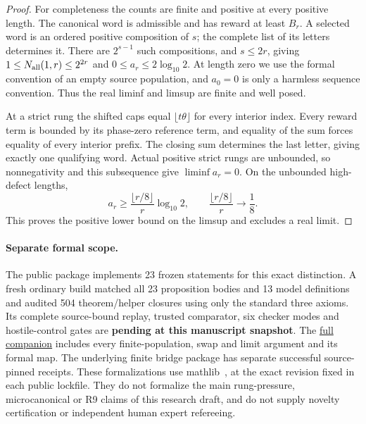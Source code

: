 \documentclass[11pt,letterpaper]{article}
\begin{document}
\begin{proof}
For completeness the counts are finite and positive at every positive length.
The canonical word is admissible and has reward at least $B_r$.
A selected word is an ordered positive composition of $s$; the complete list
of its letters determines it. There are $2^{s-1}$ such compositions, and
$s\le2r$, giving
$1\le N_{\rm all}(1,r)\le2^{2r}$ and
$0\le a_r\le2\log_{10}2$. At length zero we use the formal convention of an empty source population, and
$a_0=0$ is only a harmless sequence convention. Thus the real
liminf and limsup are finite and well posed.

At a strict rung the shifted caps equal $\lfloor t\theta\rfloor$ for every
interior index. Every reward term is bounded by its phase-zero reference
term, and equality of the sum forces equality of every interior prefix.
The closing sum determines the last letter, giving exactly one qualifying
word. Actual positive strict rungs are unbounded, so nonnegativity and this
subsequence give $\liminf a_r=0$. On the unbounded high-defect lengths,
\[
 a_r\ge\frac{\lfloor r/8\rfloor}{r}\log_{10}2,
 \qquad \frac{\lfloor r/8\rfloor}{r}\longrightarrow\frac18.
\]
This proves the positive lower bound on the limsup and excludes a real limit.
\end{proof}

\paragraph{Separate formal scope.}
The public  package implements 23 frozen
statements for this exact distinction. A fresh ordinary build matched all 23
proposition bodies and 13 model definitions and audited 504 theorem/helper
closures using only the standard three axioms. Its complete source-bound
replay, trusted comparator, six checker modes and hostile-control gates are
\textbf{pending at this manuscript snapshot}. The
\href{../../lean/external_unrestricted/ARGUMENT.md}{full companion}
includes every finite-population, swap and limit argument and its formal map.
The underlying finite bridge package has separate successful source-pinned
receipts. These formalizations use mathlib~\cite{mathlib}, at the exact
revision fixed in each public lockfile. They do not formalize the main
rung-pressure, microcanonical or R9 claims of this research draft, and do
not supply novelty certification or independent human expert refereeing.
\end{document}
